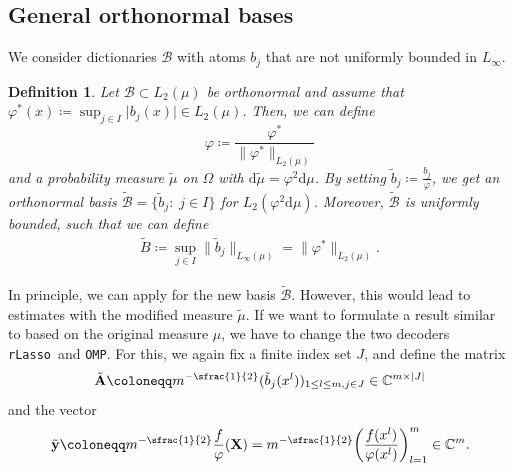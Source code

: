 \documentclass[11pt,reqno, a4paper]{article}
\numberwithin{equation}{section}
\newtheorem{definition}[theorem]{Definition}
\newcommand{\rlasso}{\texttt{rLasso}}
\newcommand{\omp}{\texttt{OMP}}
\begin{document}
\subsection{General orthonormal bases}\label{Legendre}

We consider dictionaries $\mathcal B$ with atoms $b_j$ that are not uniformly bounded in $L_\infty$. 
\begin{definition}
Let $\mathcal{B}\subset L_2(\mu)$ be orthonormal and assume that $\varphi^*(x)\coloneqq\sup_{j\in I}\lvert b_j(x) \rvert \in L_2(\mu)$.
Then, we can define
\begin{equation}
\varphi \coloneqq \frac{\varphi^*}{\lVert\varphi^*\rVert_{L_2(\mu)}}
\end{equation}
and a probability measure $\tilde \mu$ on $\Omega$ with $\mathrm d \tilde \mu = \varphi^2 \mathrm d \mu$.
By setting $\tilde{b}_j \coloneqq \frac{b_j}{\varphi}$, we get an orthonormal basis $\tilde{\mathcal{B}}=\{\tilde{b}_j\colon \; j\in I\}$ for $L_2(\varphi^2\mathrm{d}\mu)$.
Moreover, $\tilde{\mathcal{B}}$ is uniformly bounded, such that we can define
\begin{gather}
\tilde{B}\coloneqq \sup\limits_{j\in I}\lVert \tilde{b}_j\rVert_{L_\infty(\mu)} = \lVert \varphi^*\rVert_{L_2(\mu)}.
\end{gather}
\end{definition}
In principle, we can apply  for the new basis $\tilde{\mathcal{B}}$.
However, this would lead to estimates with the modified measure $\tilde \mu$.
If we want to formulate a result similar to  based on the original measure $\mu$, we have to change the two decoders \rlasso \ and \omp.
For this, we again fix a finite index set $J$, and define the matrix
\begin{gather}\label{eq:mod_matrix}
	\tilde{\mathbf{A}} \coloneqq m^{-\sfrac{1}{2}}(\tilde{b}_j(x^l))_{1 \leq l \leq m, j \in J} \in \mathbb{C}^{m\times \lvert J\rvert}
\end{gather}
and the vector
\begin{gather}
\tilde{\mathbf{y}} \coloneqq m^{-\sfrac{1}{2}} \frac{f}{\varphi}(\mathbf{X}) = m^{-\sfrac{1}{2}}\biggl(\frac{f(x^l)}{\varphi(x^l)}\biggr)_{l=1}^m \in \mathbb{C}^m.
\end{gather}
\end{document}
